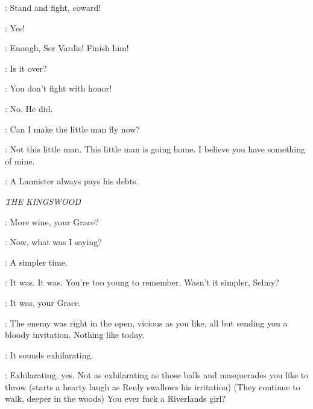 \LYSA:  Stand and fight, coward! 


\TYRION:  Yes! 

\LYSA:  Enough, Ser Vardis! Finish him!  


\ROBYN:  Is it over? 

\LYSA: You don't fight with honor!

\BRONN:  No.  He did.


\ROBYN: Can I make the little man fly now?

\TYRION: Not this little man. This little man is going home.  I believe you have something of mine.


\TYRION:  A Lannister always pays his debts.  


\scene

\textit{THE KINGSWOOD} 


\LANCEL: More wine, your Grace? 

\ROBERT:  Now, what was I saying? 

\RENLY:  A simpler time. 

\ROBERT:  It was. It was. You're too young to remember. Wasn't it simpler, Selmy? 

\SELMY:  It was, your Grace. 

\ROBERT:  The enemy was right in the open, vicious as you like, all but sending you a bloody invitation. Nothing like today. 

\RENLY:  It sounds exhilarating. 

\ROBERT:  Exhilarating, yes. Not as exhilarating as those balls and masquerades you like to throw (starts a hearty laugh as Renly swallows his irritation) (They continue to walk, deeper in the woods) You ever fuck a Riverlands girl? 

